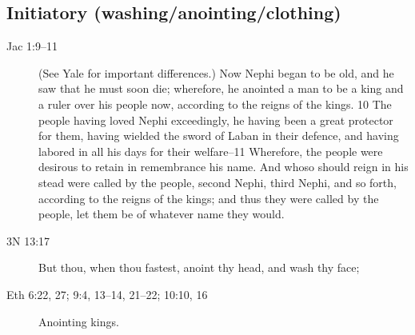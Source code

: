 	\subsection{Initiatory (washing/anointing/clothing)} %

		\begin{description}
		\item[Jac 1:9--11] (See Yale for important differences.) Now Nephi began to be old, and he saw that he must soon die; wherefore, he anointed a man to be a king and a ruler over his people now, according to the reigns of the kings. 10 The people having loved Nephi exceedingly, he having been a great protector for them, having wielded the sword of Laban in their defence, and having labored in all his days for their welfare--11 Wherefore, the people were desirous to retain in remembrance his name. And whoso should reign in his stead were called by the people, second Nephi, third Nephi, and so forth, according to the reigns of the kings; and thus they were called by the people, let them be of whatever name they would.
		\item[3N 13:17] But thou, when thou fastest, anoint thy head, and wash thy face;
		\item[Eth 6:22, 27; 9:4, 13--14, 21--22; 10:10, 16] Anointing kings.

\end{description}
